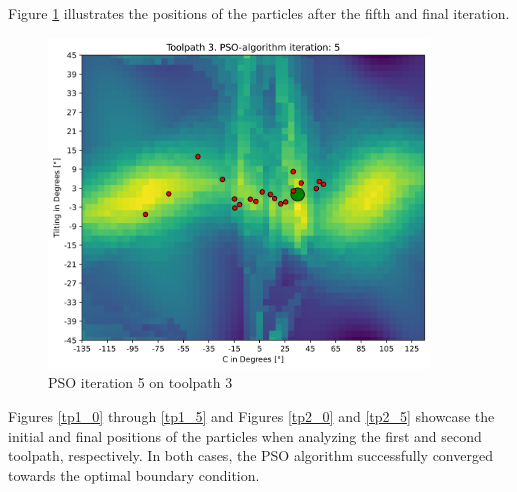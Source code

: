 Figure \ref{5_true} illustrates the positions of the particles after the fifth and final iteration.

\begin{figure}[H]
	\centerline{\includegraphics[width=0.9\textwidth]{figures/swarm_true/3_5.png}}
	\caption{PSO iteration 5 on toolpath 3}
	\label{5_true}
\end{figure}

\newpage
Figures \ref{tp1_0} through \ref{tp1_5} and Figures \ref{tp2_0} and \ref{tp2_5} showcase the initial and final positions of the particles when analyzing the first and second toolpath, respectively. In both cases, the PSO algorithm successfully converged towards the optimal boundary condition.

